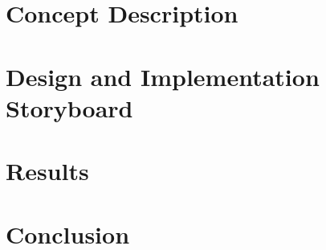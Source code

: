 \documentclass[a4paper, 12pt, oneside, BCOR1cm,toc=chapterentrywithdots]{scrbook}
\begin{document}
\chapter{Concept Description}
\chapter{Design and Implementation Storyboard}
\chapter{Results}
\chapter{Conclusion}



\end{document}
